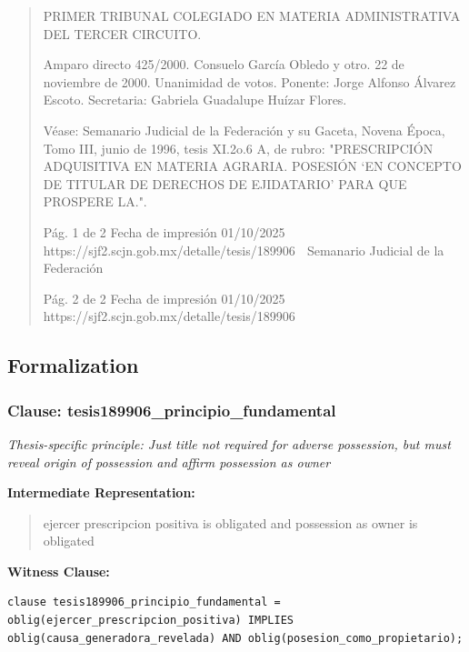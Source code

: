 \documentclass[11pt,a4paper]{article}
\begin{document}
\begin{quote}
PRIMER TRIBUNAL COLEGIADO EN MATERIA ADMINISTRATIVA DEL TERCER CIRCUITO.


Amparo directo 425/2000. Consuelo García Obledo y otro. 22 de noviembre de 2000. Unanimidad
de votos. Ponente: Jorge Alfonso Álvarez Escoto. Secretaria: Gabriela Guadalupe Huízar Flores.

Véase: Semanario Judicial de la Federación y su Gaceta, Novena Época, Tomo III, junio de 1996,
tesis XI.2o.6 A, de rubro: "PRESCRIPCIÓN ADQUISITIVA EN MATERIA AGRARIA. POSESIÓN
‘EN CONCEPTO DE TITULAR DE DERECHOS DE EJIDATARIO’ PARA QUE PROSPERE LA.".




                                              Pág. 1 de 2             Fecha de impresión 01/10/2025
  https://sjf2.scjn.gob.mx/detalle/tesis/189906
                                                Semanario Judicial de la Federación




                                           Pág. 2 de 2       Fecha de impresión 01/10/2025
https://sjf2.scjn.gob.mx/detalle/tesis/189906

\end{quote}

\subsection{Formalization}

\subsubsection{Clause: tesis189906\_principio\_fundamental}

\textit{Thesis-specific principle: Just title not required for adverse possession, but must reveal origin of possession and affirm possession as owner}

\textbf{Intermediate Representation:}

\begin{quote}
ejercer prescripcion positiva is obligated and possession as owner is obligated
\end{quote}

\textbf{Witness Clause:}

\begin{lstlisting}[style=witnessstyle, language=Witness]
clause tesis189906_principio_fundamental = oblig(ejercer_prescripcion_positiva) IMPLIES oblig(causa_generadora_revelada) AND oblig(posesion_como_propietario);
\end{lstlisting}
\end{document}
